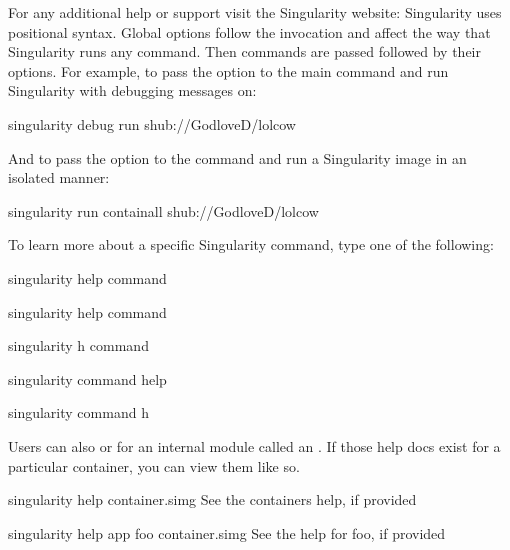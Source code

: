 \documentclass[letterpaper,10pt,english]{sphinxmanual}
\begin{document}
For any additional help or support visit the Singularity website:
Singularity uses positional syntax. Global options follow the 
invocation and affect the way that Singularity runs any command. Then
commands are passed followed by their options.
For example, to pass the  option to the main  command and run
Singularity with debugging messages on:

%
\begin{sphinxVerbatim}[commandchars=\\\{\}]
\PYGZdl{} singularity \PYGZhy{}\PYGZhy{}debug run shub://GodloveD/lolcow
\end{sphinxVerbatim}

And to pass the  option to the  command and run a Singularity image in an
isolated manner:

%
\begin{sphinxVerbatim}[commandchars=\\\{\}]
\PYGZdl{} singularity run \PYGZhy{}\PYGZhy{}containall shub://GodloveD/lolcow
\end{sphinxVerbatim}

To learn more about a specific Singularity command, type one of the
following:

%
\begin{sphinxVerbatim}[commandchars=\\\{\}]
\PYGZdl{} singularity help \PYGZlt{}command\PYGZgt{}

\PYGZdl{} singularity \PYGZhy{}\PYGZhy{}help \PYGZlt{}command\PYGZgt{}

\PYGZdl{} singularity \PYGZhy{}h \PYGZlt{}command\PYGZgt{}

\PYGZdl{} singularity \PYGZlt{}command\PYGZgt{} \PYGZhy{}\PYGZhy{}help

\PYGZdl{} singularity \PYGZlt{}command\PYGZgt{} \PYGZhy{}h
\end{sphinxVerbatim}

Users can also {\hyperref[\detokenize{container_recipes:help-docs}]{}} or for an internal module called an . If those help
docs exist for a particular container, you can view them like so.

%
\begin{sphinxVerbatim}[commandchars=\\\{\}]
\PYGZdl{} singularity help container.simg            \PYGZsh{} See the container\PYGZsq{}s help, if provided

\PYGZdl{} singularity help \PYGZhy{}\PYGZhy{}app foo container.simg  \PYGZsh{} See the help for foo, if provided
\end{sphinxVerbatim}
\end{document}
